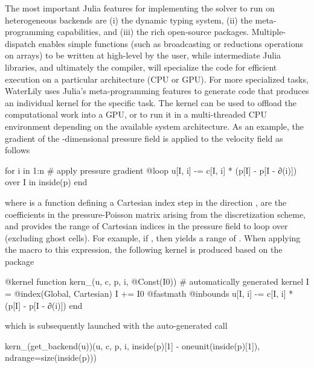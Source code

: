 \documentclass[final,3p,times]{elsarticle}
\begin{document}
The most important Julia features for implementing the solver to run on heterogeneous backends are (i) the dynamic typing system, (ii) the meta-programming capabilities, and (iii) the rich open-source packages. Multiple-dispatch enables simple functions (such as broadcasting or reductions operations on arrays) to be written at high-level by the user, while intermediate Julia libraries, and ultimately the compiler, will specialize the code for efficient execution on a particular architecture (CPU or GPU). For more specialized tasks, WaterLily uses Julia's meta-programming features to generate code that produces an individual kernel for the specific task. The kernel can be used to offload the computational work into a GPU, or to run it in a multi-threaded CPU environment depending on the available system architecture. As an example, the gradient of the -dimensional pressure field  is applied to the velocity field  as follows
\begin{jllisting}
for i in 1:n  # apply pressure gradient
    @loop u[I, i] -= c[I, i] * (p[I] - p[I - ∂(i)]) over I in inside(p)
end
\end{jllisting}
where  is a function defining a Cartesian index step in the direction ,  are the coefficients in the pressure-Poisson matrix arising from the discretization scheme, and  provides the range of Cartesian indices  in the pressure field to loop over (excluding ghost cells). For example, if , then  yields a range of . When applying the  macro to this expression, the following kernel is produced based on the  package \citep{Churavy2023}
\begin{jllisting}
@kernel function kern_(u, c, p, i, @Const(I0)) # automatically generated kernel
    I = @index(Global, Cartesian)
    I += I0
    @fastmath @inbounds u[I, i] -= c[I, i] * (p[I] - p[I - ∂(i)])
end
\end{jllisting}
which is subsequently launched with the auto-generated call
\begin{jllisting}
kern_(get_backend(u))(u, c, p, i, inside(p)[1] - oneunit(inside(p)[1]), ndrange=size(inside(p)))
\end{jllisting}
\end{document}
